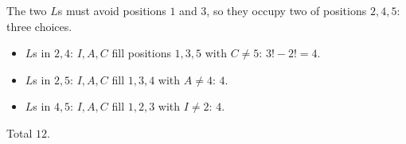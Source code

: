 The two $L$s must avoid positions $1$ and $3$, so they occupy two of positions $2,4,5$: three choices.
\begin{itemize}
\item $L$s in $2,4$: $I,A,C$ fill positions $1,3,5$ with $C\ne5$: $3!-2!=4$.
\item $L$s in $2,5$: $I,A,C$ fill $1,3,4$ with $A\ne4$: $4$.
\item $L$s in $4,5$: $I,A,C$ fill $1,2,3$ with $I\ne2$: $4$.
\end{itemize}
Total $\boxed{12}$.
